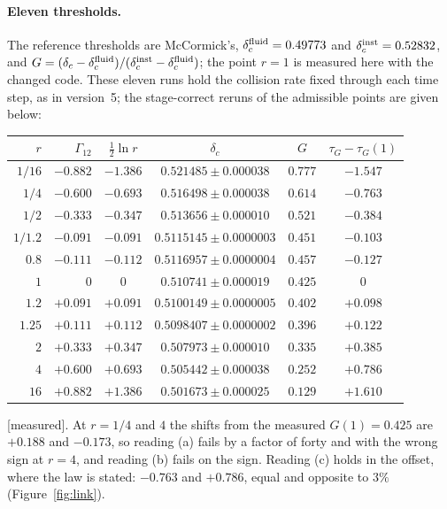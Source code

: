 \documentclass[11pt]{article}
\newcommand{\grade}[1]{\textsf{\small[#1]}}
\begin{document}
\paragraph{Eleven thresholds.} The reference thresholds are McCormick's, $\delta_c^{\rm fluid}=0.49773$ and $\delta_c^{\rm inst}=0.52832$, and $G=(\delta_c-\delta_c^{\rm fluid})/(\delta_c^{\rm inst}-\delta_c^{\rm fluid})$; the point $r=1$ is measured here with the changed code. These eleven runs hold the collision rate fixed through each time step, as in version~5; the stage-correct reruns of the admissible points are given below:
\begin{center}\begin{tabular}{rrcccc}\toprule
$r$ & $\Gamma_{12}$ & $\tfrac12\ln r$ & $\delta_c$ & $G$ & $\tau_G-\tau_G(1)$\\\midrule
$1/16$ & $-0.882$ & $-1.386$ & $0.521485\pm0.000038$ & $0.777$ & $-1.547$\\
$1/4$ & $-0.600$ & $-0.693$ & $0.516498\pm0.000038$ & $0.614$ & $-0.763$\\
$1/2$ & $-0.333$ & $-0.347$ & $0.513656\pm0.000010$ & $0.521$ & $-0.384$\\
$1/1.2$ & $-0.091$ & $-0.091$ & $0.5115145\pm0.0000003$ & $0.451$ & $-0.103$\\
$0.8$ & $-0.111$ & $-0.112$ & $0.5116957\pm0.0000004$ & $0.457$ & $-0.127$\\
$1$ & $0$ & $0$ & $0.510741\pm0.000019$ & $0.425$ & $0$\\
$1.2$ & $+0.091$ & $+0.091$ & $0.5100149\pm0.0000005$ & $0.402$ & $+0.098$\\
$1.25$ & $+0.111$ & $+0.112$ & $0.5098407\pm0.0000002$ & $0.396$ & $+0.122$\\
$2$ & $+0.333$ & $+0.347$ & $0.507973\pm0.000010$ & $0.335$ & $+0.385$\\
$4$ & $+0.600$ & $+0.693$ & $0.505442\pm0.000038$ & $0.252$ & $+0.786$\\
$16$ & $+0.882$ & $+1.386$ & $0.501673\pm0.000025$ & $0.129$ & $+1.610$\\\bottomrule\end{tabular}\end{center}
\grade{measured}. At $r=1/4$ and $4$ the shifts from the measured $G(1)=0.425$ are $+0.188$ and $-0.173$, so reading (a) fails by a factor of forty and with the wrong sign at $r=4$, and reading (b) fails on the sign. Reading (c) holds in the offset, where the law is stated: $-0.763$ and $+0.786$, equal and opposite to $3\%$ (Figure~\ref{fig:link}).
\end{document}
